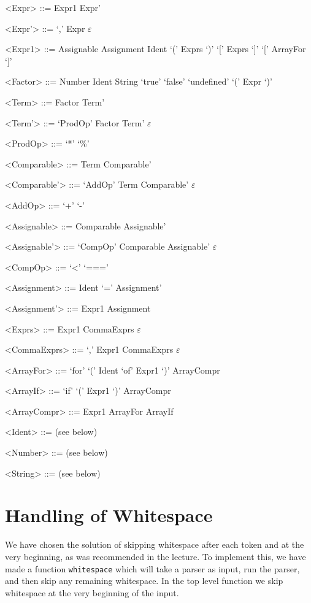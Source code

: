 \documentclass{article}
\begin{document}
\begin{grammar}
	\let\syntleft\relax
	\let\syntright\relax
	
	<Expr> ::= Expr1 Expr'
	
	<Expr'> ::= `,' Expr
	\alt $\varepsilon$

	<Expr1> ::= Assignable
	\alt Assignment
	\alt Ident `(' Exprs `)'
	\alt `[' Exprs `]'
	\alt `[' ArrayFor `]'
		
	<Factor> ::= Number
	\alt Ident
	\alt String
	\alt `true'
	\alt `false'
	\alt `undefined'
	\alt `(' Expr `)'
	
	<Term> ::= Factor Term'
	
	<Term'> ::= `ProdOp' Factor Term'
	\alt $\varepsilon$
	
	<ProdOp> ::= `*'
	\alt `\%'
	
	<Comparable> ::= Term Comparable'
	
	<Comparable'> ::= `AddOp' Term Comparable'
	\alt $\varepsilon$
	
	<AddOp> ::= `+'
	\alt `-'
	
	<Assignable> ::= Comparable Assignable'
	
	<Assignable'> ::= `CompOp' Comparable Assignable'
	\alt $\varepsilon$
	
	
	<CompOp> ::= `<'
	\alt `==='
	
	<Assignment> ::= Ident `=' Assignment'
	
	<Assignment'> ::= Expr1
	\alt Assignment
	
	<Exprs> ::= Expr1 CommaExprs
	\alt $\varepsilon$	
	
	<CommaExprs> ::= `,' Expr1 CommaExprs
	\alt $\varepsilon$
	
	<ArrayFor> ::= `for' `(' Ident `of' Expr1 `)' ArrayCompr
	
	<ArrayIf> ::= `if' `(' Expr1 `)' ArrayCompr
	
	<ArrayCompr> ::= Expr1
	\alt ArrayFor
	\alt ArrayIf
	
	<Ident> ::= (see below)
	
	<Number> ::= (see below)
	
	<String> ::= (see below)
\end{grammar}


\section{Handling of Whitespace}
We have chosen the solution of skipping whitespace after each token and at the very beginning, as was recommended in the lecture. To implement this, we have made a function \texttt{whitespace} which will take a parser as input, run the parser, and then skip any remaining whitespace. In the top level function we skip whitespace at the very beginning of the input.
\end{document}

